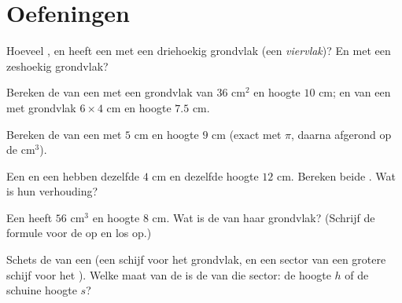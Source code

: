 \section{Oefeningen}

\begin{exercise}[$\star$]\label{exo:g8:solids:1}
Hoeveel ,  en  heeft een  met een driehoekig
grondvlak (een \emph{viervlak})? En met een zeshoekig grondvlak?
\end{exercise}

\begin{exercise}[$\star$]\label{exo:g8:solids:2}
Bereken de  van een  met een grondvlak van $36$ cm$^2$ en hoogte
$10$ cm; en van een  met  grondvlak $6 \times 4$ cm en hoogte
$7.5$ cm.
\end{exercise}

\begin{exercise}[$\star$]\label{exo:g8:solids:3}
Bereken de  van een  met  $5$ cm en hoogte $9$ cm (exact met
$\pi$, daarna afgerond op de cm$^3$).
\end{exercise}

\begin{exercise}[$\star$]\label{exo:g8:solids:4}
Een  en een  hebben dezelfde  $4$ cm en dezelfde hoogte $12$
cm. Bereken beide . Wat is hun verhouding?
\end{exercise}

\begin{exercise}[$\star$]\label{exo:g8:solids:5}
Een  heeft  $56$ cm$^3$ en hoogte $8$ cm. Wat is de  van
haar grondvlak? (Schrijf de formule voor de  op en los op.)
\end{exercise}

\begin{exercise}[$\star$]\label{exo:g8:solids:6}
Schets de  van een  (een schijf voor het grondvlak, en een sector van
een grotere schijf voor het ). Welke maat van de  is de  van
die sector: de hoogte $h$ of de schuine hoogte $s$?
\end{exercise}

